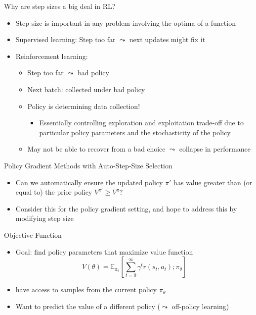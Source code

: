 \documentclass[aspectratio=169]{../latex_main/tntbeamer}  %
\begin{document}
\begin{frame}[c]{Why are step sizes a big deal in RL?}
	
    \begin{itemize}
        \item Step size is important in any problem involving the optima of a function
        \item Supervised learning: Step too far $\leadsto$ next updates might fix it
        \item Reinforcement learning:
        \begin{itemize}
            \item Step too far $\leadsto$ bad policy
            \item Next batch: collected under bad policy
            \item \alert{Policy is determining data collection!} 
            \begin{itemize}
                \item Essentially controlling exploration and exploitation trade-off due to particular policy parameters and the stochasticity of the policy
            \end{itemize}
            \item May not be able to recover from a bad choice $\leadsto$ collapse in performance
        \end{itemize}
    \end{itemize}

\end{frame}
\begin{frame}[c]{Policy Gradient Methods with Auto-Step-Size Selection}
	
    \begin{itemize}
        \item Can we automatically ensure the updated policy $\pi'$ has value greater than (or equal to) the prior policy $V^{\pi'} \geq V^\pi$?
        \item Consider this for the policy gradient setting, and hope to address this by modifying step size
    \end{itemize}

\end{frame}
\begin{frame}[c]{Objective Function}
	
    \begin{itemize}
        \item Goal: find policy parameters that maximize value function
        $$ V(\theta) = \mathbb{E}_{\pi_\theta} \left[ \sum_{t=0}^{\infty} \gamma^t r(s_t, a_t); \pi_\theta \right]$$
        \item have access to samples from the current policy $\pi_\theta$ 
        \item Want to predict the value of a different policy ($\leadsto$ off-policy learning)
    \end{itemize}

\end{frame}
\end{document}
